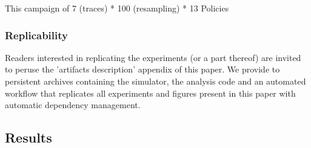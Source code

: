 \documentclass[sigconf,review]{acmart}
\begin{document}
This campaign of 7 (traces) * 100 (resampling) * 13 Policies

\subsubsection{Replicability}

Readers interested in replicating the experiments (or a part thereof) are
invited to peruse the 'artifacts description' appendix of this paper. We
provide to persistent archives containing the simulator, the analysis code and
an automated workflow that replicates all experiments and figures present in
this paper with automatic dependency management.

\subsection{Results}
\label{sub:results}
\end{document}
